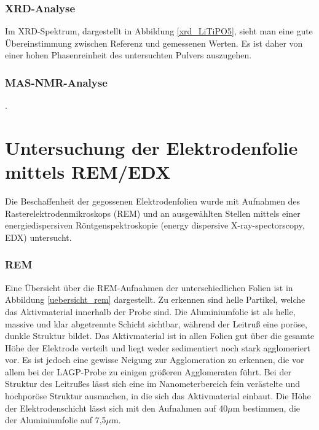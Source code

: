 \documentclass[a4paper, 11pt, headsepline,footsepline,twoside,abstract]{scrbook}
\begin{document}
\subsubsection{XRD-Analyse}
Im XRD-Spektrum, dargestellt in Abbildung \ref{xrd_LiTiPO5}, sieht man eine gute Übereinstimmung zwischen Referenz und gemessenen Werten. Es ist daher von einer hohen Phasenreinheit des untersuchten Pulvers auszugehen.
\subsubsection{MAS-NMR-Analyse}
.
\newpage
\section{Untersuchung der Elektrodenfolie mittels REM/EDX}
Die Beschaffenheit der gegossenen Elektrodenfolien wurde mit Aufnahmen des Rasterelektrodenmikroskops (REM) und an ausgewählten Stellen mittels einer energiedispersiven Röntgenspektroskopie (energy dispersive X-ray-spectorscopy, EDX) untersucht.
\subsubsection{REM}
Eine Übersicht  über die REM-Aufnahmen der unterschiedlichen Folien ist in Abbildung \ref{uebersicht_rem} dargestellt. Zu erkennen sind helle Partikel, welche das Aktivmaterial innerhalb der Probe sind. Die Aluminiumfolie ist als helle, massive  und klar abgetrennte Schicht sichtbar, während der Leitruß eine poröse, dunkle Struktur bildet. Das Aktivmaterial ist in allen Folien gut über die gesamte Höhe der Elektrode verteilt und liegt weder sedimentiert noch stark agglomeriert vor. Es ist jedoch eine gewisse Neigung zur Agglomeration zu erkennen, die vor allem bei der LAGP-Probe zu einigen größeren Agglomeraten führt. Bei der Struktur des Leitrußes lässt sich eine im Nanometerbereich fein verästelte und hochporöse Struktur ausmachen, in die sich das Aktivmaterial einbaut. Die Höhe der Elektrodenschicht lässt sich mit den Aufnahmen auf 40$\mu$m bestimmen, die der Aluminiumfolie auf 7,5$\mu$m.
\end{document}
